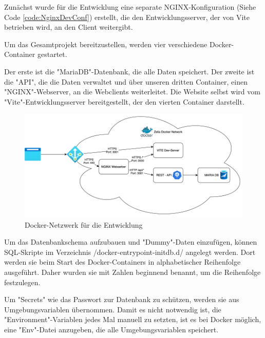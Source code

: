 
Zunächst wurde für die Entwicklung eine separate NGINX-Konfiguration (Siehe Code \ref{code:NginxDevConf}) erstellt, die den Entwicklungsserver, der von Vite betrieben wird, an den Client weitergibt.


Um das Gesamtprojekt bereitzustellen, werden vier verschiedene Docker-Container gestartet.

Der erste ist die "MariaDB"-Datenbank, die alle Daten speichert. Der zweite ist die "API", die die Daten verwaltet und über unseren dritten Container, einen "NGINX"-Webserver, an die Webclients weiterleitet. Die Website selbst wird vom "Vite"-Entwicklungsserver bereitgestellt, der den vierten Container darstellt. 

\begin{figure}[H]
    \centering
    \includegraphics{media/Docker/DevNetwork.png}
    \caption{Docker-Netzwerk für die Entwicklung}
\end{figure}

Um das Datenbankschema aufzubauen und "Dummy"-Daten einzufügen, können SQL-Skripte im Verzeichnis /docker-entrypoint-initdb.d/ angelegt werden. Dort werden sie beim Start des Docker-Containers in alphabetischer Reihenfolge ausgeführt. Daher wurden sie mit Zahlen beginnend benannt, um die Reihenfolge festzulegen.

Um "Secrets" wie das Passwort zur Datenbank zu schützen, werden sie aus Umgebungsvariablen übernommen. Damit es nicht notwendig ist, die "Environment"-Variablen jedes Mal manuell zu setzten, ist es bei Docker möglich, eine "Env"-Datei anzugeben, die alle Umgebungsvariablen speichert. 

